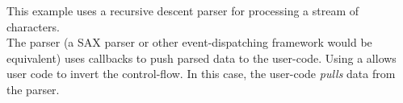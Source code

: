\label{appendix}
This example uses a recursive descent parser for processing a stream of
characters.\\
The parser (a SAX parser or other event-dispatching framework would be
equivalent) uses callbacks to push parsed data to the user-code.
Using a \sfcoro allows user code to invert the control-flow. In this case, the
user-code \textit{pulls} data from the parser.
